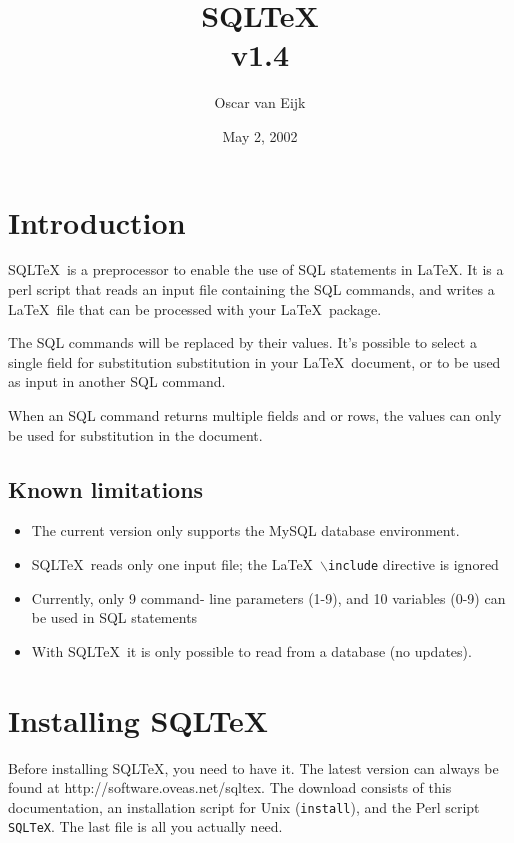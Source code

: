 \documentclass{article}
\newcommand{\bs}{\begin{math}\backslash\end{math}}
\begin{document}
\title{SQL\TeX\\v1.4}
\date{May 2, 2002}
\author{Oscar van Eijk}

\maketitle

\hrulefill

\tableofcontents

\hrulefill

\section{Introduction}

SQL\TeX\ is a preprocessor to enable the use of SQL statements in \LaTeX. It is a perl script that reads
an input file containing the SQL commands, and writes a \LaTeX\ file that can be processed with your
\LaTeX\ package.

The SQL commands will be replaced by their values. It's possible to select a single field for substitution
substitution in your \LaTeX\ document, or to be used as input in another SQL command.

When an SQL command returns multiple fields and or rows, the values can only be used for substitution
in the document.

\subsection{Known limitations}

\begin{itemize}
\item The current version only supports the MySQL database environment.
\item SQL\TeX\ reads only one input file; the \LaTeX\ \texttt{\bs include} directive is ignored
\item Currently, only 9 command- line parameters (1-9), and 10 variables (0-9) can be used in SQL
statements
\item With SQL\TeX\, it is only possible to read from a database (no updates).
\end{itemize}

\section{Installing SQL\TeX}

Before installing SQL\TeX, you need to have it. The latest version can always be found at
\textsf{http://software.oveas.net/sqltex}.
The download consists of this do\-cumentation, an installation script for Unix
(\texttt{install}), and the Perl script \texttt{SQLTeX}. The last file is all
you actually need.
\end{document}
